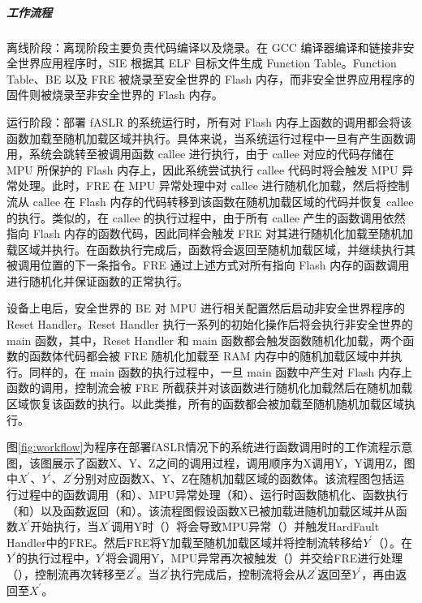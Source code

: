 \documentclass[12pt,a4paper]{ctexart}
\numberwithin{figure}{section}
\begin{document}
\subparagraph{工作流程}
\par 离线阶段：离现阶段主要负责代码编译以及烧录。在 GCC 编译器编译和链接非安全世界应用程序时，SIE 根据其 ELF 目标文件生成 Function Table。Function Table、BE 以及 FRE 被烧录至安全世界的 Flash 内存，而非安全世界应用程序的固件则被烧录至非安全世界的 Flash 内存。
\par 运行阶段：部署 fASLR 的系统运行时，所有对 Flash 内存上函数的调用都会将该函数加载至随机加载区域并执行。具体来说，当系统运行过程中一旦有产生函数调用，系统会跳转至被调用函数 callee 进行执行，由于 callee 对应的代码存储在 MPU 所保护的 Flash 内存上，因此系统尝试执行 callee 代码时将会触发 MPU 异常处理。此时，FRE 在 MPU 异常处理中对 callee 进行随机化加载，然后将控制流从 callee 在 Flash 内存的代码转移到该函数在随机加载区域的代码并恢复 callee 的执行。类似的，在 callee 的执行过程中，由于所有 callee 产生的函数调用依然指向 Flash 内存的函数代码，因此同样会触发 FRE 对其进行随机化加载至随机加载区域并执行。在函数执行完成后，函数将会返回至随机加载区域，并继续执行其被调用位置的下一条指令。FRE 通过上述方式对所有指向 Flash 内存的函数调用进行随机化并保证函数的正常执行。
\par 设备上电后，安全世界的 BE 对 MPU 进行相关配置然后启动非安全世界程序的 Reset Handler。Reset Handler 执行一系列的初始化操作后将会执行非安全世界的 main 函数，其中，Reset Handler 和 main 函数都会触发函数随机化加载，两个函数的函数体代码都会被 FRE 随机化加载至 RAM 内存中的随机加载区域中并执行。同样的，在 main 函数的执行过程中，一旦 main 函数中产生对 Flash 内存上函数的调用，控制流会被 FRE 所截获并对该函数进行随机化加载然后在随机加载区域恢复该函数的执行。以此类推，所有的函数都会被加载至随机随机加载区域执行。
\par 图\ref{fig:workflow}为程序在部署fASLR情况下的系统进行函数调用时的工作流程示意图，该图展示了函数X、Y、Z之间的调用过程，调用顺序为X调用Y，Y调用Z，图中$X^{'}、Y^{'}、Z^{'}$分别对应函数X、Y、Z在随机加载区域的函数体。该流程图包括运行过程中的函数调用（和）、MPU异常处理（和）、运行时函数随机化、函数执行（和）以及函数返回（和）。该流程图假设函数X已被加载进随机加载区域并从函数$X^{'}$开始执行，当$X^{'}$调用Y时（）将会导致MPU异常（）并触发HardFault Handler中的FRE。然后FRE将Y加载至随机加载区域并将控制流转移给$Y^{'}$（）。在$Y^{'}$的执行过程中，$Y^{'}$将会调用Y，MPU异常再次被触发（）并交给FRE进行处理（），控制流再次转移至$Z^{'}$。当$Z^{'}$执行完成后，控制流将会从$Z^{'}$返回至$Y^{'}$，再由返回至$X^{'}$。
\end{document}
